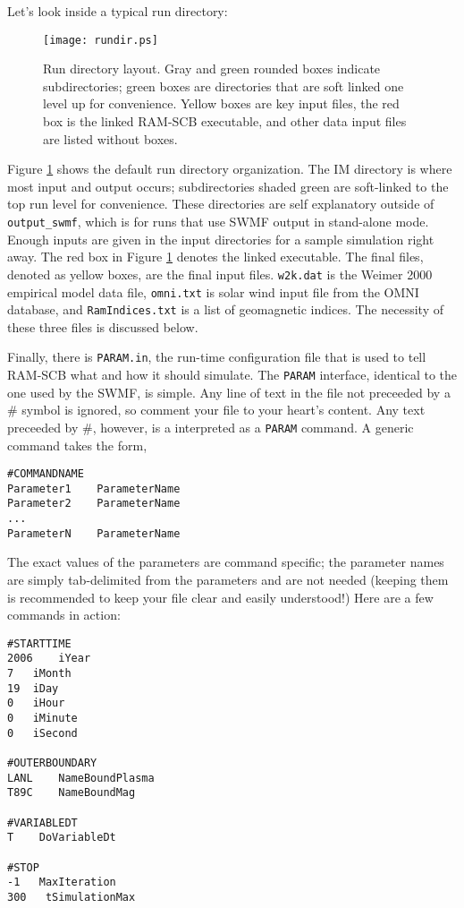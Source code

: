 Let's look inside a typical run directory:

\begin{figure}[h]
 \begin{center}
  \texttt{[image: rundir.ps]}
 \end{center}
 \caption{Run directory layout. Gray and green rounded boxes indicate subdirectories; green boxes are directories that are soft linked one level up for convenience. Yellow boxes are key input files, the red box is the linked RAM-SCB executable, and other data input files are listed without boxes.}
 \label{fig:rundir}
\end{figure}

Figure \ref{fig:rundir} shows the default run directory organization. The IM directory is where most input and output occurs; subdirectories shaded green are soft-linked to the top run level for convenience. These directories are self explanatory outside of {\tt output\_swmf}, which is for runs that use SWMF output in stand-alone mode. Enough inputs are given in the input directories for a sample simulation right away. The red box in Figure \ref{fig:rundir} denotes the linked executable. The final files, denoted as yellow boxes, are the final input files. {\tt w2k.dat} is the Weimer 2000 empirical model data file, {\tt omni.txt} is solar wind input file from the OMNI database, and {\tt RamIndices.txt} is a list of geomagnetic indices. The necessity of these three files is discussed below.

Finally, there is {\tt PARAM.in}, the run-time configuration file that is used to tell RAM-SCB what and how it should simulate. The {\tt PARAM} interface, identical to the one used by the SWMF, is simple. Any line of text in the file not preceeded by a \# symbol is ignored, so comment your file to your heart's content. Any text preceeded by \#, however, is a interpreted as a {\tt PARAM} command. A generic command takes the form,

\begin{verbatim}
#COMMANDNAME
Parameter1    ParameterName
Parameter2    ParameterName
...
ParameterN    ParameterName
\end{verbatim}

The exact values of the parameters are command specific; the parameter names are simply tab-delimited from the parameters and are not needed (keeping them is recommended to keep your file clear and easily understood!) Here are a few commands in action:

\begin{verbatim}
#STARTTIME 
2006	iYear 
7	iMonth 
19	iDay 
0	iHour 
0	iMinute 
0	iSecond

#OUTERBOUNDARY 
LANL	NameBoundPlasma 
T89C	NameBoundMag

#VARIABLEDT
T    DoVariableDt

#STOP
-1   MaxIteration
300   tSimulationMax
\end{verbatim}

